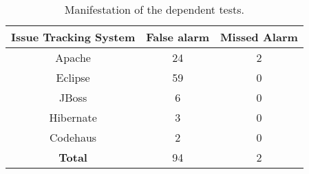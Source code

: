\begin{table}
\centering
\setlength{\tabcolsep}{0.45\tabcolsep}
\begin{tabular}{|c||c|c|}
\hline
\textbf{Issue Tracking System} & \textbf{False alarm} & \textbf{Missed Alarm} \\
\hline
Apache &24 & 2 \\
\hline
Eclipse & 59 & 0 \\
\hline
JBoss& 6 & 0 \\
\hline
Hibernate & 3 & 0 \\
\hline
Codehaus & 2 & 0 \\
\hline
\hline
\textbf{Total}  & 94 & 2 \\
\hline
\end{tabular}
\caption{
Manifestation of the \dtnum dependent tests.
}
\label{tab:reper}
\end{table}

